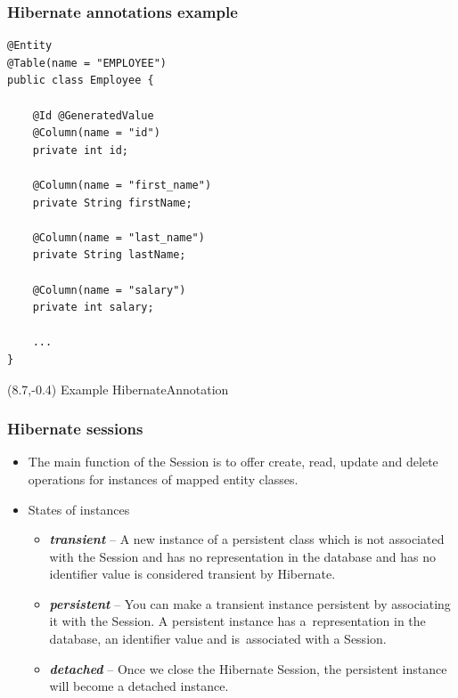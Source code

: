 \documentclass[10pt,xcolor=pdflatex]{beamer}
\newcommand{\itmspace}[2]{\item #2 \vspace{#1}}
\begin{document}
\begin{frame}[fragile]\frametitle{Hibernate annotations example}
\lstset{language=Java}
\begin{lstlisting}
@Entity
@Table(name = "EMPLOYEE")
public class Employee {

    @Id @GeneratedValue
    @Column(name = "id")
    private int id;

    @Column(name = "first_name")
    private String firstName;

    @Column(name = "last_name")
    private String lastName;

    @Column(name = "salary")
    private int salary;

    ...
}
\end{lstlisting}
\begin{textblock}{15}(8.7,-0.4)
    {\footnotesize Example HibernateAnnotation}
\end{textblock}
\end{frame}


\begin{frame}\frametitle{Hibernate sessions}
	\begin{itemize}
		\itmspace{.4cm} {The main function of the Session is to offer create, read, update and delete operations for instances of mapped entity classes.}
        \item States of instances
          \begin{itemize}
        	\item {\textbf{\emph{transient}} -- A new instance of a persistent class which is not associated with the Session and has no representation in the database and has no identifier value is considered transient by Hibernate.}
        	\item {\textbf{\emph{persistent}} -- You can make a transient instance persistent by associating it with the Session. A persistent instance has a~representation in the database, an identifier value and is~associated with a Session.}
        	\item \textbf{\emph{detached}} -- Once we close the Hibernate Session, the persistent instance will become a detached instance.
          \end{itemize}
	\end{itemize}
\end{frame}
\end{document}
